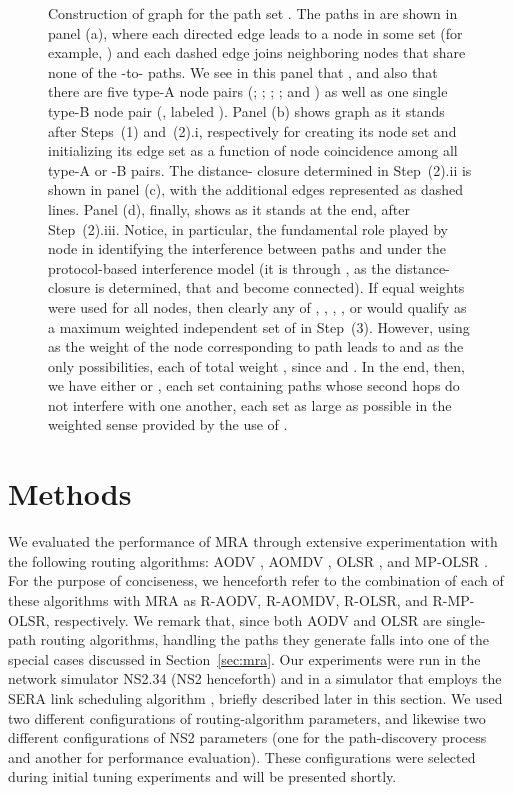 \documentclass{article}
\begin{document}
\begin{figure}[p]
\centering
{}
\caption{Construction of graph  for the path set
. The paths in  are shown in
panel (a), where each directed edge leads to a node in some 
set (for example, ) and each dashed edge
joins neighboring nodes that share none of the -to- paths. We see in this
panel that , and also that there are five
type-A node pairs (; ; ; ; and ) as
well as one single type-B node pair (, labeled ). Panel (b) shows
graph  as it stands after Steps~(1) and~(2).i, respectively for creating
its node set  and initializing its edge set  as a function of node
coincidence among all type-A or -B pairs. The distance- closure determined in
Step~(2).ii is shown in panel (c), with the additional edges represented as
dashed lines. Panel (d), finally, shows  as it stands at the end, after
Step~(2).iii. Notice, in particular, the fundamental role played by node  in
identifying the interference between paths  and  under the protocol-based
interference model (it is through , as the distance- closure is
determined, that  and  become connected). If equal weights were used for
all nodes, then clearly any of , , , , or
 would qualify as a maximum weighted independent set of  in
Step~(3). However, using  as the weight of the node corresponding to path
 leads to  and  as the only possibilities, each of total
weight , since  and . In the end, then, we have
either
 or ,
each set containing paths whose second hops do not interfere with one another,
each set as large as possible in the weighted sense provided by the use of
.}
\label{figure1}
\end{figure}

\section{Methods}\label{sec:methods}

We evaluated the performance of MRA through extensive experimentation with the
following routing algorithms: AODV \cite{Perkins1999}, AOMDV \cite{Marina2002},
OLSR \cite{Jacquet2001}, and MP-OLSR \cite{Yi2011}. For the purpose of
conciseness, we henceforth refer to the combination of each of these algorithms
with MRA as R-AODV, R-AOMDV, R-OLSR, and R-MP-OLSR, respectively. We remark
that, since both AODV and OLSR are single-path routing algorithms, handling the
paths they generate falls into one of the special cases discussed in
Section~\ref{sec:mra}. Our experiments were run in the network simulator NS2.34
(NS2 henceforth) \cite{ns2} and in a simulator that employs the SERA link
scheduling algorithm \cite{Fabio2012}, briefly described later in this section.
We used two different configurations of routing-algorithm parameters, and
likewise two different configurations of NS2 parameters (one for the
path-discovery process and another for performance evaluation). These
configurations were selected during initial tuning experiments and will be
presented shortly.
\end{document}
